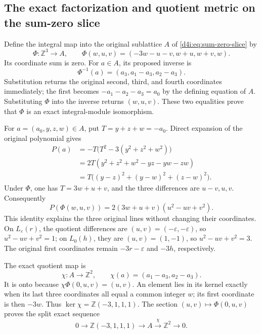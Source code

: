 \subsection{The exact factorization and quotient metric on the sum-zero slice}
\label{d4i:sec:factorization}

Define the integral map into the original sublattice $A$ of
\eqref{d4i:eq:sum-zero-slice} by
\[
 \Phi:\mathbb Z^3\longrightarrow A,\qquad
 \Phi(w,u,v)=(-3w-u-v,w+u,w+v,w).
 \label{d4i:eq:slice-map}\tag{D4I23}
\]
Its coordinate sum is zero. For $a\in A$, its proposed inverse is
\[
                 \Phi^{-1}(a)=(a_3,a_1-a_3,a_2-a_3).
 \label{d4i:eq:slice-inverse}\tag{D4I24}
\]
Substitution returns the original second, third, and fourth
coordinates immediately; the first becomes $-a_1-a_2-a_3=a_0$
by the defining equation of $A$. Substituting $\Phi$ into the
inverse returns $(w,u,v)$. These two equalities prove that $\Phi$
is an exact integral-module isomorphism.

For $a=(a_0,y,z,w)\in A$, put $T=y+z+w=-a_0$. Direct expansion
of the original polynomial gives
\[
\begin{aligned}
 P(a)&=-T\bigl(T^2-3(y^2+z^2+w^2)\bigr)\\
     &=2T(y^2+z^2+w^2-yz-yw-zw)\\
     &=T\bigl((y-z)^2+(y-w)^2+(z-w)^2\bigr).
\end{aligned}
 \label{d4i:eq:slice-expansion}\tag{D4I25}
\]
Under $\Phi$, one has $T=3w+u+v$, and the three differences are
$u-v,u,v$. Consequently
\[
                 P(\Phi(w,u,v))=2(3w+u+v)(u^2-uv+v^2).
 \label{d4i:eq:factorization}\tag{D4I26}
\]
This identity explains the three original lines without changing
their coordinates. On $L_\varepsilon(r)$, the quotient differences
are $(u,v)=(-\varepsilon,-\varepsilon)$, so
$u^2-uv+v^2=1$; on $L_0(h)$, they are $(u,v)=(1,-1)$, so
$u^2-uv+v^2=3$. The original first coordinates remain
$-3r-\varepsilon$ and $-3h$, respectively.

The exact quotient map is
\[
 \chi:A\longrightarrow\mathbb Z^2,\qquad
                  \chi(a)=(a_1-a_3,a_2-a_3).
 \label{d4i:eq:quotient-map}\tag{D4I27}
\]
It is onto because $\chi\Phi(0,u,v)=(u,v)$. An element lies in
its kernel exactly when its last three coordinates all equal a
common integer $w$; its first coordinate is then $-3w$.
Thus $\ker\chi=\mathbb Z(-3,1,1,1)$. The section
$(u,v)\mapsto\Phi(0,u,v)$ proves the split exact sequence
\[
 0\longrightarrow\mathbb Z(-3,1,1,1)\longrightarrow A
       \xrightarrow{\ \chi\ }\mathbb Z^2\longrightarrow0.
 \label{d4i:eq:split-exact-sequence}\tag{D4I28}
\]

